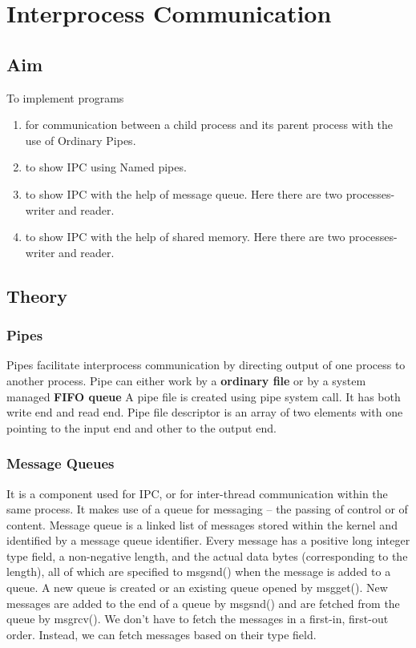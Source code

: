 \section{Interprocess Communication}
\subsection{Aim}
To implement programs
\begin{enumerate}
  \item for communication between a child process and its parent process with the use of Ordinary Pipes.
  \item to show IPC using Named pipes.
  \item to show IPC with the help of message queue. Here there are two processes- writer and reader.
  \item to show IPC with the help of shared memory. Here there are two processes- writer and reader.
\end{enumerate}

\subsection{Theory}
\subsubsection{Pipes}
Pipes facilitate interprocess communication by directing output of 
one process to another process. Pipe can either work by a \textbf{ordinary file} 
or by a system managed \textbf{FIFO queue}
A pipe file is created using pipe system call. It has
both write end and read end. Pipe file descriptor is an array of two elements with 
one pointing to the input end and other to the output end.

\subsubsection{Message Queues}
It is a component used for IPC, or for inter-thread communication within the same
process. It makes use of a queue for messaging – the passing of control or of content.
Message queue is a linked list of messages stored within the kernel and identified
by a message queue identifier. Every message has a positive long integer type field,
a non-negative length, and the actual data bytes (corresponding to the length), all
of which are specified to msgsnd() when the message is added to a queue. A new
queue is created or an existing queue opened by msgget(). New messages are added
to the end of a queue by msgsnd() and are fetched from the queue by msgrcv(). We
don’t have to fetch the messages in a first-in, first-out order. Instead, we can fetch
messages based on their type field.

